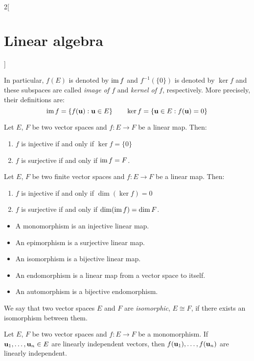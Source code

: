 \documentclass[../../../main.tex]{subfiles}
\begin{document}
\begin{multicols}{2}[\section{Linear algebra}]
\begin{prop}
\begin{enumerate}
    \end{enumerate}
    In particular, $f(E)$ is denoted by $\operatorname{im} f$ and $f^{-1}(\{0\})$ is denoted by $\ker f$ and these subspaces are called \textit{image of $f$} and \textit{kernel of $f$}, respectively. More precisely, their definitions are:
    $$\operatorname{im} f=\{f(\vb{u}): \vb{u}\in E\}\qquad\ker f=\{\vb{u}\in E: f(\vb{u})=0\}$$
\end{prop}
\begin{prop}
    Let $E$, $F$ be two vector spaces and $f:E\rightarrow F$ be a linear map. Then:
    \begin{enumerate}
        \item $f$ is injective if and only if $\ker f=\{0\}$
        \item $f$ is surjective if and only if $\operatorname{im} f=F$.
    \end{enumerate}
\end{prop}
\begin{corollary}
    Let $E$, $F$ be two finite vector spaces and $f:E\rightarrow F$ be a linear map. Then:
    \begin{enumerate}
        \item $f$ is injective if and only if $\dim(\ker f)=0$
        \item $f$ is surjective if and only if $\dim(\operatorname{im} f)=\dim F$.
    \end{enumerate}
\end{corollary}
\begin{definition}
\hfill
\begin{itemize}
    \item A monomorphism is an injective linear map.
    \item An epimorphism is a surjective linear map.
    \item An isomorphism is a bijective linear map.
    \item An endomorphism is a linear map from a vector space to itself.
    \item An automorphism is a bijective endomorphism.
\end{itemize}
\end{definition}
\begin{definition}
    We say that two vector spaces $E$ and $F$ are \textit{isomorphic}, $E\cong F$, if there exists an isomorphism between them.
\end{definition}
\begin{prop}
    Let $E$, $F$ be two vector spaces and $f:E\rightarrow F$ be a monomorphism. If $\vb{u}_1,\ldots,\vb{u}_n\in E$ are linearly independent vectors, then $f(\vb{u}_1),\ldots,f(\vb{u}_n)$  are linearly independent.

\end{prop}
\end{multicols}
\end{document}
